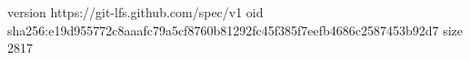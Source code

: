 version https://git-lfs.github.com/spec/v1
oid sha256:e19d955772c8aaafc79a5cf8760b81292fc45f385f7eefb4686c2587453b92d7
size 2817
